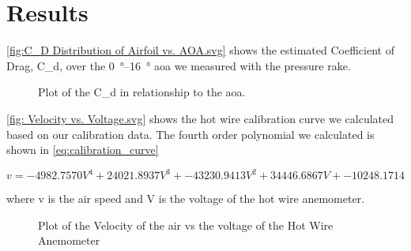 \chapter{Results}
\label{cp:results}



\autoref{fig:C_D Distribution of Airfoil vs. AOA.svg} shows the estimated Coefficient of Drag, \gls{C_d}, over the \qtyrange{0}{16}{\degree} \acrshort{aoa} we measured with the pressure rake.

\begin{figure}[htpb]
    \centering
    
    \caption[Plot of the \gls{C_d} in relationship to the \acrshort{aoa}.]{Plot of the \gls{C_d} in relationship to the \acrshort{aoa}.}
    \label{fig:C_D Distribution of Airfoil vs. AOA.svg}
\end{figure}

\autoref{fig: Velocity vs. Voltage.svg} shows the hot wire calibration curve we calculated based on our calibration data. The fourth order polynomial we calculated is shown in \autoref{eq:calibration_curve}

\begin{equation} \label{eq:calibration_curve}
    v = -4982.7570V^4 + 24021.8937V^3 + -43230.9413V^2 + 34446.6867V + -10248.1714
\end{equation}

\noindent where \gls{v} is the air speed and \gls{V} is the voltage of the hot wire anemometer.

\begin{figure}[htpb]
    \centering
    
    \caption[Plot of the Velocity of the air vs the voltage of the  Hot Wire Anemometer]{Plot of the Velocity of the air vs the voltage of the  Hot Wire Anemometer}
    \label{fig: Velocity vs. Voltage.svg}
    \vspace*{4in}
\end{figure}
